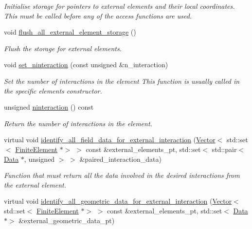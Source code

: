 \begin{DoxyCompactItemize}
\begin{DoxyCompactList}\small\item\em Initialise storage for pointers to external elements and their local coordinates. This must be called before any of the access functions are used. \end{DoxyCompactList}\item 
void \hyperlink{classoomph_1_1ElementWithExternalElement_af8ad5670124479401b925f923a9713b0}{flush\+\_\+all\+\_\+external\+\_\+element\+\_\+storage} ()
\begin{DoxyCompactList}\small\item\em Flush the storage for external elements. \end{DoxyCompactList}\item 
void \hyperlink{classoomph_1_1ElementWithExternalElement_a180b99d0cf83f3b2d90427e77b90fc96}{set\+\_\+ninteraction} (const unsigned \&n\+\_\+interaction)
\begin{DoxyCompactList}\small\item\em Set the number of interactions in the element This function is usually called in the specific element\textquotesingle{}s constructor. \end{DoxyCompactList}\item 
unsigned \hyperlink{classoomph_1_1ElementWithExternalElement_ad63351d9c35ebe15e194a898a5daebc1}{ninteraction} () const
\begin{DoxyCompactList}\small\item\em Return the number of interactions in the element. \end{DoxyCompactList}\item 
virtual void \hyperlink{classoomph_1_1ElementWithExternalElement_a822d64019a82588e16053ec86f37226c}{identify\+\_\+all\+\_\+field\+\_\+data\+\_\+for\+\_\+external\+\_\+interaction} (\hyperlink{classoomph_1_1Vector}{Vector}$<$ std\+::set$<$ \hyperlink{classoomph_1_1FiniteElement}{Finite\+Element} $\ast$$>$ $>$ const \&external\+\_\+elements\+\_\+pt, std\+::set$<$ std\+::pair$<$ \hyperlink{classoomph_1_1Data}{Data} $\ast$, unsigned $>$ $>$ \&paired\+\_\+interaction\+\_\+data)
\begin{DoxyCompactList}\small\item\em Function that must return all the data involved in the desired interactions from the external element. \end{DoxyCompactList}\item 
virtual void \hyperlink{classoomph_1_1ElementWithExternalElement_aa6d8ce7d46edf8fc06557776663af172}{identify\+\_\+all\+\_\+geometric\+\_\+data\+\_\+for\+\_\+external\+\_\+interaction} (\hyperlink{classoomph_1_1Vector}{Vector}$<$ std\+::set$<$ \hyperlink{classoomph_1_1FiniteElement}{Finite\+Element} $\ast$$>$ $>$ const \&external\+\_\+elements\+\_\+pt, std\+::set$<$ \hyperlink{classoomph_1_1Data}{Data} $\ast$$>$ \&external\+\_\+geometric\+\_\+data\+\_\+pt)
$$
\end{DoxyCompactItemize}
